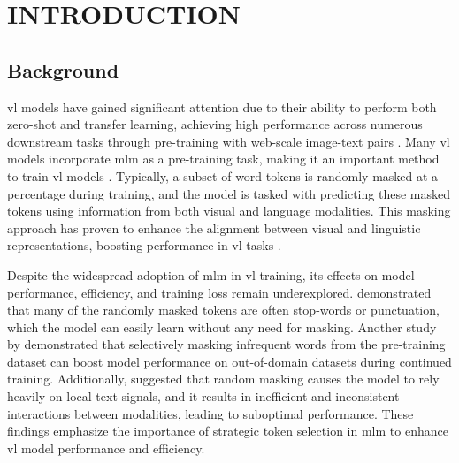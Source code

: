 \setlength{\parindent}{0in}
\setlength{\parskip}{1.5mm}
\setlength{\baselineskip}{1.6em}

\chapter{INTRODUCTION}
\section{Background}
\acrfull{vl} models have gained significant attention due to their ability to perform both zero-shot and transfer learning, achieving high performance across numerous downstream tasks through pre-training with web-scale image-text pairs \cite{s-clip, medclip, vl-review}.  
Many \acrshort{vl} models incorporate \acrfull{mlm} as a pre-training task, making it an important method to train \acrshort{vl} models \cite{albef, mplug, uniter, beit-3, lxmert}.  
Typically, a subset of word tokens is randomly masked at a percentage during training, and the model is tasked with predicting these masked tokens using information from both visual and language modalities.  
This masking approach has proven to enhance the alignment between visual and linguistic representations, boosting performance in \acrshort{vl} tasks \cite{lxmert}.  

Despite the widespread adoption of \acrshort{mlm} in \acrshort{vl} training, its effects on model performance, efficiency, and training loss remain underexplored.  
 demonstrated that many of the randomly masked tokens are often stop-words or punctuation, which the model can easily learn without any need for masking.  
Another study by  demonstrated that selectively masking infrequent words from the pre-training dataset can boost model performance on out-of-domain datasets during continued training.  
Additionally,  suggested that random masking causes the model to rely heavily on local text signals, and it results in inefficient and inconsistent interactions between modalities, leading to suboptimal performance.  
These findings emphasize the importance of strategic token selection in \acrshort{mlm} to enhance \acrshort{vl} model performance and efficiency.  

